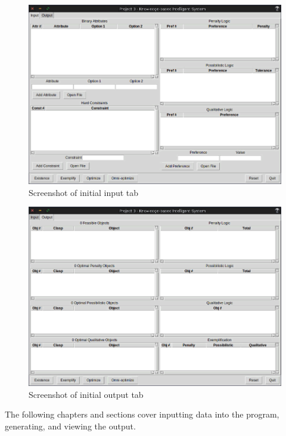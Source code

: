 \documentclass[12pt]{report}
\begin{document}
\begin{multicols}{2}
\begin{figure}[H]
\begin{center}
\includegraphics[scale=0.25,trim=1cm 1cm 1cm 1cm]{input_start}
\caption{Screenshot of initial input tab}
\end{center}
\end{figure}
\begin{figure}[H]
\begin{center}
\includegraphics[scale=0.25,trim=1cm 1cm 1cm 1cm]{output_start}
\caption{Screenshot of initial output tab}
\end{center}
\end{figure}
\end{multicols}

The following chapters and sections cover inputting data into the program, generating, and viewing the output.
\end{document}
